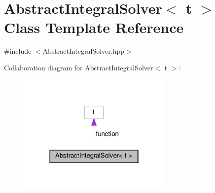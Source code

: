 \hypertarget{class_abstract_integral_solver}{}\section{Abstract\+Integral\+Solver$<$ t $>$ Class Template Reference}
\label{class_abstract_integral_solver}


{\ttfamily \#include $<$Abstract\+Integral\+Solver.\+hpp$>$}



Collaboration diagram for Abstract\+Integral\+Solver$<$ t $>$\+:
\nopagebreak
\begin{figure}[H]
\begin{center}
\leavevmode
\includegraphics[width=214pt]{class_abstract_integral_solver__coll__graph}
\end{center}
\end{figure}
